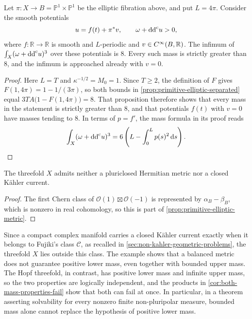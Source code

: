 \begin{corollary}\label{prop:elliptic-radial-mass}
Let $\pi\colon X\to B=\mathbb P^1\times\mathbb P^1$ be the elliptic fibration above, and put $L=4\pi$. Consider the smooth potentials
\[
 u=f(t)+\pi^*v,\qquad \omega+\mathrm{dd}^{\mathrm{c}} u>0,
\]
where $f\colon\mathbb R\to\mathbb R$ is smooth and $L$-periodic and $v\in C^\infty(B,\mathbb R)$. The infimum of $\int_X(\omega+\mathrm{dd}^{\mathrm{c}} u)^3$ over these potentials is $8$. Every such mass is strictly greater than $8$, and the infimum is approached already with $v=0$.
\end{corollary}
\begin{proof}
Here $L=T$ and $\kappa^{-1/2}=M_0=1$. Since $T\geq2$, the definition of $F$ gives $F(1,4\pi)=1-1/(3\pi)$, so both bounds in \cref{prop:primitive-elliptic-separated} equal $3TA\bigl(1-F(1,4\pi)\bigr)=8$. That proposition therefore shows that every mass in the statement is strictly greater than $8$, and that potentials $f(t)$ with $v=0$ have masses tending to $8$. In terms of $p=f'$, the mass formula in its proof reads
\begin{equation}\label{eq:elliptic-radial-mass}
 \int_X(\omega+\mathrm{dd}^{\mathrm{c}} u)^3
 =6\left(L-\int_0^L p(s)^2\,\mathrm{d}s\right).
\end{equation}
\end{proof}

\begin{corollary}\label{prop:lower-mass-no-pluriclosed}
The threefold $X$ admits neither a pluriclosed Hermitian metric nor a closed K\"ahler current.
\end{corollary}
\begin{proof}
The first Chern class of $\mathcal O(1)\boxtimes\mathcal O(-1)$ is represented by $\alpha_B-\beta_B$, which is nonzero in real cohomology, so this is part of \cref{prop:primitive-elliptic-metric}.
\end{proof}

Since a compact complex manifold carries a closed K\"ahler current exactly when it belongs to Fujiki's class $\mathcal C$, as recalled in \cref{sec:non-kahler-geometric-problems}, the threefold $X$ lies outside this class. The example shows that a balanced metric does not guarantee positive lower mass, even together with bounded upper mass. The Hopf threefold, in contrast, has positive lower mass and infinite upper mass, so the two properties are logically independent, and the products in \cref{cor:both-mass-properties-fail} show that both can fail at once. In particular, in a theorem asserting solvability for every nonzero finite non-pluripolar measure, bounded mass alone cannot replace the hypothesis of positive lower mass.

